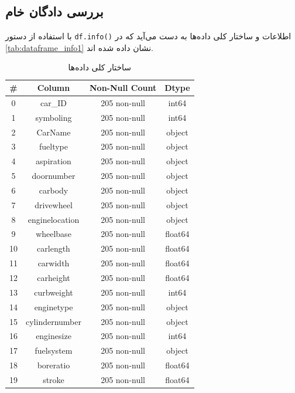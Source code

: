\documentclass[11pt]{article}
\begin{document}
	\subsection{بررسی دادگان خام}
	با استفاده از دستور 
	\verb|df.info()|
	اطلاعات و ساختار کلی داده‌ها به دست می‌آید که در 
	\autoref{tab:dataframe_info1}
	نشان داده شده اند.
	\begin{table}[h!]
		\centering
		\caption{ساختار کلی داده‌ها}
		\begin{latin}
		{\scriptsize
		\begin{tabular}{cccc}
				\toprule
				\# & Column             & Non-Null Count & Dtype   \\ 
				\midrule
				0  & car\_ID            & 205 non-null   & int64   \\ 
				1  & symboling          & 205 non-null   & int64   \\ 
				2  & CarName            & 205 non-null   & object  \\ 
				3  & fueltype           & 205 non-null   & object  \\ 
				4  & aspiration         & 205 non-null   & object  \\ 
				5  & doornumber         & 205 non-null   & object  \\ 
				6  & carbody            & 205 non-null   & object  \\ 
				7  & drivewheel         & 205 non-null   & object  \\ 
				8  & enginelocation     & 205 non-null   & object  \\ 
				9  & wheelbase          & 205 non-null   & float64 \\ 
				10 & carlength          & 205 non-null   & float64 \\ 
				11 & carwidth           & 205 non-null   & float64 \\ 
				12 & carheight          & 205 non-null   & float64 \\ 
				13 & curbweight         & 205 non-null   & int64   \\ 
				14 & enginetype         & 205 non-null   & object  \\ 
				15 & cylindernumber     & 205 non-null   & object  \\ 
				16 & enginesize         & 205 non-null   & int64   \\ 
				17 & fuelsystem         & 205 non-null   & object  \\ 
				18 & boreratio          & 205 non-null   & float64 \\ 
				19 & stroke             & 205 non-null   & float64 \\ 

\end{tabular}}
\end{latin}
\end{table}
\end{document}
